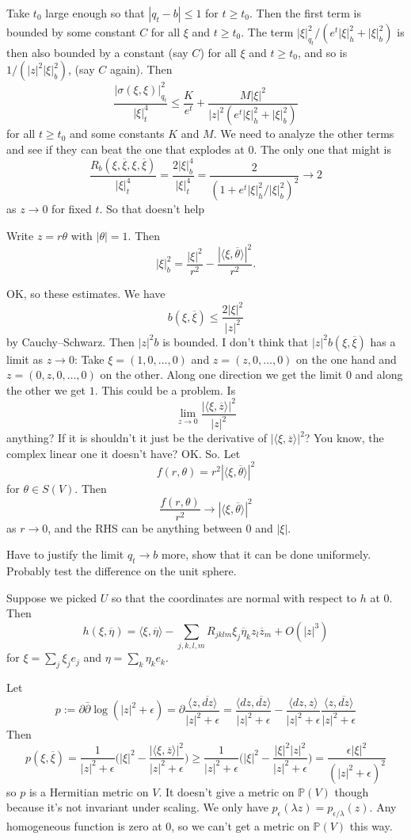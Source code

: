 \documentclass[10pt,a4paper]{amsart}
\newcommand{\kk}[1]{\mathbb{#1}}
\def\<{\langle}
\def\>{\rangle}
\def\ov#1{\overline{#1}}
\def\p{\partial}
\def\bp{\bar\partial}
\begin{document}
Take $t_0$ large enough so that $|q_t - b| \leq 1$ for $t \geq t_0$.
Then the first term is bounded by some constant $C$ for all $\xi$ and $t \geq
t_0$. The term $|\xi|^2_{q_t} / (e^t |\xi|_h^2 + |\xi|^2_b)$ is then also
bounded by a constant (say $C$) for all $\xi$ and $t \geq t_0$, and
so is $1/(|z|^2 |\xi|^2_b)$, (say $C$ again). Then
$$
\frac{|\sigma(\xi, \xi)|_{q_t}^2}{|\xi|_t^4}
\leq
\frac{K}{e^t}
+ \frac{M |\xi|^2}{|z|^2(e^t|\xi|_h^2 + |\xi|_b^2)}
$$
for all $t \geq t_0$ and some constants $K$ and $M$.
We need to analyze the other terms and see if they can beat the one
that explodes at $0$.
The only one that might is
$$
\frac{R_b(\xi,\ov\xi,\xi,\ov\xi)}{|\xi|_t^4}
= \frac{2 |\xi|_b^4}{|\xi|_t^4}
= \frac{2}{(1 + e^t |\xi|_h^2/|\xi|_b^2)^2}
\to 2
$$
as $z \to 0$ for fixed $t$. So that doesn't help

Write $z = r \theta$ with $|\theta| = 1$. Then
$$
|\xi|^2_b = \frac{|\xi|^2}{r^2} - \frac{|\<\xi, \ov\theta\>|^2}{r^2}.
$$

OK, so these estimates.
We have
$$
b(\xi,\ov\xi) \leq \frac{2|\xi|^2}{|z|^2}
$$
by Cauchy--Schwarz. Then $|z|^2 b$ is bounded.
I don't think that $|z|^2 b(\xi, \ov\xi)$ has a limit as $z \to 0$:
Take $\xi = (1, 0, \ldots, 0)$ and $z = (z, 0, \ldots, 0)$ on the one hand and
$z = (0, z, 0, \ldots, 0)$ on the other.
Along one direction we get the limit $0$ and along the other we get $1$.
This could be a problem.
Is
$$
\lim_{z \to 0} \frac{|\<\xi, \ov z\>|^2}{|z|^2}
$$
anything?
If it is shouldn't it just be the derivative of $|\<\xi, \ov z\>|^2$?
You know, the complex linear one it doesn't have?
OK. So. Let
$$
f(r,\theta) = r^2|\<\xi, \ov{\theta}\>|^2
$$
for $\theta \in S(V)$. Then
$$
\frac{f(r, \theta)}{r^2} \to |\<\xi, \ov{\theta}\>|^2
$$
as $r \to 0$, and the RHS can be anything between $0$ and $|\xi|$.

Have to justify the limit $q_t \to b$ more, show that it can be done uniformely.
Probably test the difference on the unit sphere.


Suppose we picked $U$ so that the coordinates are normal with respect to $h$ at
$0$.
Then
$$
h(\xi,\ov\eta)
= \<\xi, \ov\eta\>
- \sum_{j,k,l,m} R_{jklm} \xi_j \ov{\eta}_k z_l \ov z_m
+ O(|z|^3)
$$
for $\xi = \sum_j \xi_j e_j$ and $\eta = \sum_k \eta_k e_k$.

Let
$$
p :=
\p \bp \log(|z|^2 + \epsilon)
= \p \frac{\<z, \ov{dz} \>}{|z|^2 + \epsilon}
= \frac{\<dz, \ov{dz} \>}{|z|^2 + \epsilon}
- \frac{\<dz, z \>}{|z|^2 + \epsilon}
\frac{\<z, \ov{dz} \>}{|z|^2 + \epsilon}
$$
Then
$$
p(\xi,\ov\xi)
= \frac{1}{|z|^2 + \epsilon}
\biggl(
|\xi|^2
- \frac{|\<\xi, \ov z\>|^2}{|z|^2 + \epsilon}
\biggr)
\geq
\frac{1}{|z|^2 + \epsilon}
\biggl(
|\xi|^2
- \frac{|\xi|^2 |z|^2}{|z|^2 + \epsilon}
\biggr)
=
\frac{\epsilon |\xi|^2}{(|z|^2 + \epsilon)^2}
$$
so $p$ is a Hermitian metric on $V$.
It doesn't give a metric on $\kk P(V)$ though because it's not invariant
under scaling.
We only have $p_\epsilon(\lambda z) = p_{\epsilon/\lambda}(z)$.
Any homogeneous function is zero at $0$, so we can't get a metric on $\kk P(V)$
this way.
\end{document}
